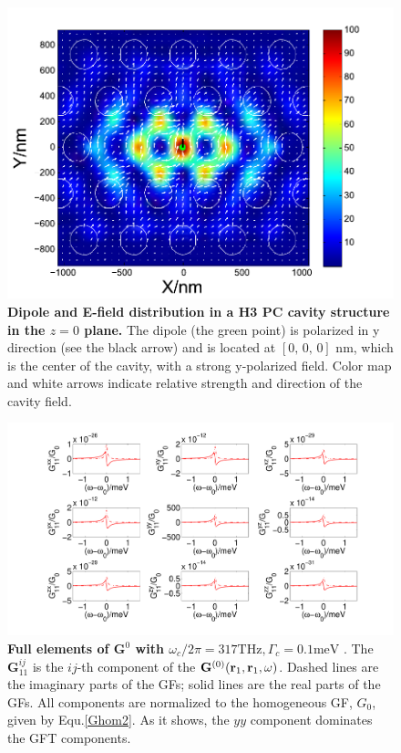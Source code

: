 \begin{figure}[H]
\centering
\begin{center}
\includegraphics[width=16cm]{./Figs/dotsmode1_1}
\end{center}
\caption[Dipole and E-field distributions in a H3 PC cavity structure.]{\textbf{   Dipole and E-field distribution in a H3 PC cavity structure in the $z=0$ plane.}  The dipole (the green point) is polarized in y direction (see the black arrow) and is located at $[0,\, 0,\, 0]$ nm, which is the center of the cavity, with a strong y-polarized field. Color map and white arrows indicate relative strength and direction of the cavity field.}
\label{dotsmode1_1}
\end{figure}

\begin{figure}[H]
\centering
\begin{center}
\includegraphics[width=16cm]{./Figs/G84_11_1}
\end{center}
\caption[Diagram of GFT tensor elements.]{\textbf{Full elements of $\mathbf{G}^0$ with $\omega_c/2\pi = 317 {\text {THz}}, \Gamma_c = 0.1 {\text {meV}}$ }. The $\mathbf{G}^{ij}_{11}$ is the $ij$-th component of the $\mathbf{G}^{(0)}(\mathbf{r}_1,\mathbf{r}_1,\omega)$. Dashed lines are the imaginary parts of the GFs; solid lines are the real parts of the GFs. All components are normalized to the homogeneous GF, $G_0$, given by Equ.\eqref{Ghom2}. As it shows, the $yy$ component dominates the GFT components.}
\label{G84_11_1}
\end{figure}

